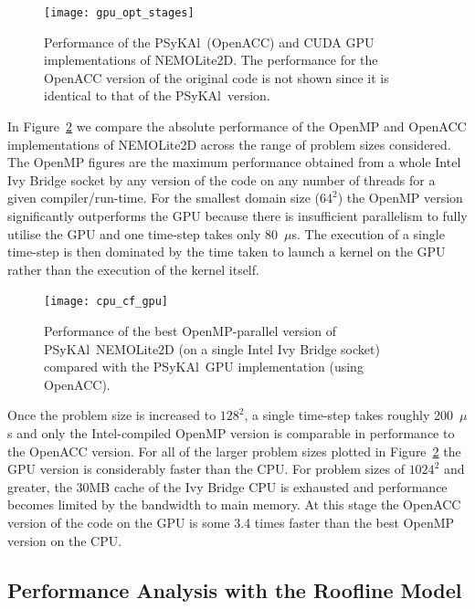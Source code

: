 \documentclass[journal]{IEEEtran}
\newcommand{\psykal}{{PS}y{KA}l}
\begin{document}
\begin{figure}
\centering
\texttt{[image: gpu\_opt\_stages]}
\caption{Performance of the \psykal\ (OpenACC) and CUDA GPU
  implementations of NEMOLite2D. The performance for the OpenACC
  version of the original code is not shown since it is identical to
  that of the \psykal\ version.}
\label{FIG_gpu_opt_stages}
\end{figure}

In Figure~\ref{FIG_cpu_cf_gpu} we compare the absolute performance of
the OpenMP and OpenACC implementations of NEMOLite2D across the range
of problem sizes considered. The OpenMP figures are the maximum
performance obtained from a whole Intel Ivy Bridge socket by any
version of the code on any number of threads for a given
compiler/run-time. For the smallest domain size ($64^2$) the OpenMP
version significantly outperforms the GPU because there is
insufficient parallelism to fully utilise the GPU and one time-step
takes only 80~$\mu$s. The execution of a single time-step is then
dominated by the time taken to launch a kernel on the GPU rather than
the execution of the kernel itself.

\begin{figure}
\centering
\texttt{[image: cpu\_cf\_gpu]}
\caption{Performance of the best OpenMP-parallel version of \psykal\
  NEMOLite2D (on a single Intel Ivy Bridge socket) compared with the \psykal\ GPU implementation (using OpenACC).}
\label{FIG_cpu_cf_gpu}
\end{figure}

Once the problem size is increased to $128^2$, a single time-step
takes roughly 200~$\mu$s and only the Intel-compiled OpenMP version is
comparable in performance to the OpenACC version. For all of the
larger problem sizes plotted in Figure~\ref{FIG_cpu_cf_gpu} the GPU
version is considerably faster than the CPU.  For problem sizes of
$1024^2$ and greater, the 30MB cache of the Ivy Bridge CPU is
exhausted and performance becomes limited by the bandwidth to main
memory. At this stage the OpenACC version of the code on the GPU is
some 3.4 times faster than the best OpenMP version on the CPU.


\subsection{Performance Analysis with the Roofline Model}
\end{document}

